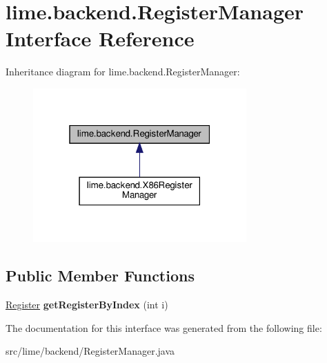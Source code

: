 \hypertarget{interfacelime_1_1backend_1_1RegisterManager}{}\section{lime.\+backend.\+Register\+Manager Interface Reference}
\label{interfacelime_1_1backend_1_1RegisterManager}


Inheritance diagram for lime.\+backend.\+Register\+Manager\+:
\nopagebreak
\begin{figure}[H]
\begin{center}
\leavevmode
\includegraphics[width=232pt]{interfacelime_1_1backend_1_1RegisterManager__inherit__graph}
\end{center}
\end{figure}
\subsection*{Public Member Functions}
\begin{DoxyCompactItemize}
\item 
\mbox{\label{interfacelime_1_1backend_1_1RegisterManager_a4bae4a1dd4c13e2d86ab07c78c7cbddd}} 
\hyperlink{classlime_1_1backend_1_1Register}{Register} {\bfseries get\+Register\+By\+Index} (int i)
\end{DoxyCompactItemize}


The documentation for this interface was generated from the following file\+:\begin{DoxyCompactItemize}
\item 
src/lime/backend/Register\+Manager.\+java\end{DoxyCompactItemize}
